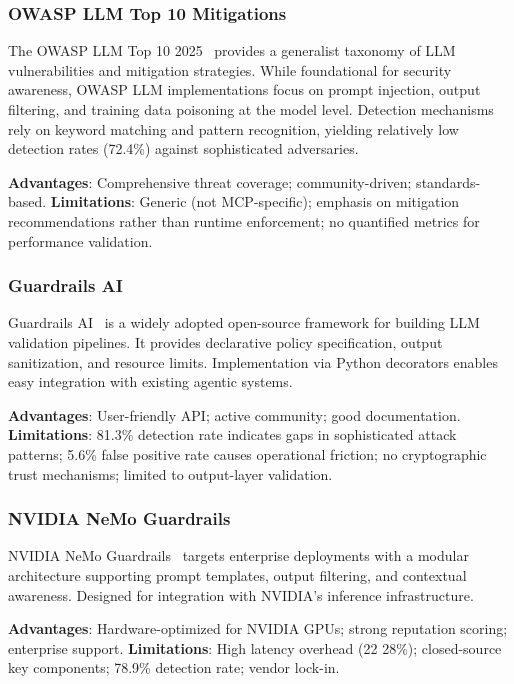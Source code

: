 \documentclass[12pt,twocolumn,journal]{IEEEtran}
\begin{document}
\subsubsection{OWASP LLM Top 10 Mitigations}

The OWASP LLM Top 10 2025~\cite{OWASP2025} provides a generalist taxonomy of LLM vulnerabilities and mitigation strategies. While foundational for security awareness, OWASP LLM implementations focus on prompt injection, output filtering, and training data poisoning at the model level. Detection mechanisms rely on keyword matching and pattern recognition, yielding relatively low detection rates (72.4\%) against sophisticated adversaries.

\textbf{Advantages}: Comprehensive threat coverage; community-driven; standards-based.
\textbf{Limitations}: Generic (not MCP-specific); emphasis on mitigation recommendations rather than runtime enforcement; no quantified metrics for performance validation.

\subsubsection{Guardrails AI}

Guardrails AI~\cite{GuardrailsAI2024} is a widely adopted open-source framework for building LLM validation pipelines. It provides declarative policy specification, output sanitization, and resource limits. Implementation via Python decorators enables easy integration with existing agentic systems.

\textbf{Advantages}: User-friendly API; active community; good documentation.
\textbf{Limitations}: 81.3\% detection rate indicates gaps in sophisticated attack patterns; 5.6\% false positive rate causes operational friction; no cryptographic trust mechanisms; limited to output-layer validation.

\subsubsection{NVIDIA NeMo Guardrails}

NVIDIA NeMo Guardrails~\cite{NVIDIANeMo2024} targets enterprise deployments with a modular architecture supporting prompt templates, output filtering, and contextual awareness. Designed for integration with NVIDIA's inference infrastructure.

\textbf{Advantages}: Hardware-optimized for NVIDIA GPUs; strong reputation scoring; enterprise support.
\textbf{Limitations}: High latency overhead (22 28\%); closed-source key components; 78.9\% detection rate; vendor lock-in.
\end{document}
